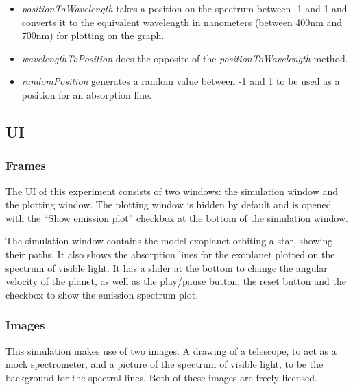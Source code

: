 \begin{itemize}
\item \emph{positionToWavelength} takes a position on the spectrum between -1 and 1 and converts it to the equivalent wavelength in nanometers (between 400nm and 700nm) for plotting on the graph.
\item \emph{wavelengthToPosition} does the opposite of the \emph{positionToWavelength} method.
\item \emph{randomPosition} generates a random value between -1 and 1 to be used as a position for an absorption line.
\end{itemize}
\subsection*{UI}
\label{sec-3-6}
\subsubsection*{Frames}
\label{sec-3-6-1}

The UI of this experiment consists of two windows: the simulation
window and the plotting window. The plotting window is hidden by
default and is opened with the ``Show emission plot'' checkbox at the
bottom of the simulation window.

The simulation window contains the model exoplanet orbiting a star,
showing their paths. It also shows the absorption lines for the
exoplanet plotted on the spectrum of visible light. It has a slider at
the bottom to change the angular velocity of the planet, as well as
the play/pause button, the reset button and the checkbox to show the
emission spectrum plot.
\subsubsection*{Images}
\label{sec-3-6-2}

This simulation makes use of two images. A drawing of a telescope, to
act as a mock spectrometer, and a picture of the spectrum of visible
light, to be the background for the spectral lines. Both of these
images are freely licensed.

